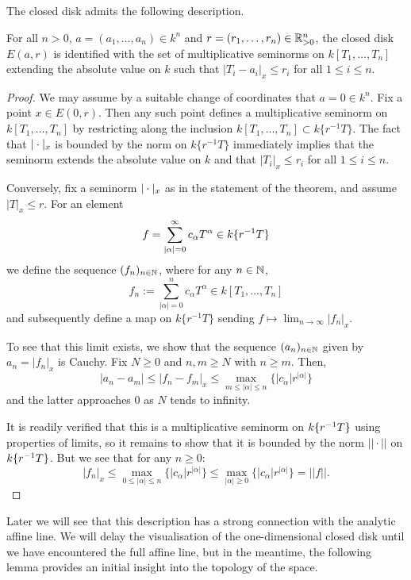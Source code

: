 The closed disk admits the following description.

\begin{prop}\label{prop:diskmaxpoint}\parencite[\S 1.4.4]{berk1}
    For all $n > 0$, $ {a} = (a_1, \dots, a_n) \in k^n$ and ${ {r} = (r_1, \dots, r_n) \in \mathbb{R}_{> 0}^n}$, the closed disk $E( {a},  {r})$ is identified with the set of multiplicative seminorms on $k[T_1, \dots, T_n]$ extending the absolute value on $k$ such that $|T_i - a_i|_x \leq r_i$ for all $1 \leq i \leq n$.
\end{prop}
\begin{proof}
    We may assume by a suitable change of coordinates that $ {a} =  {0} \in k^n$.
    Fix a point $x \in E(0, r)$. Then any such point defines a multiplicative seminorm on $k[T_1, \dots, T_n]$ by 
    restricting along the inclusion $k[T_1, \dots, T_n] \subset k\{r^{-1}T\}$. 
    The fact that $|\cdot|_x$ is bounded by the norm on $k\{r^{-1}T\}$ immediately implies that the seminorm extends the absolute value on $k$ and that $|T_i|_x \leq r_i$ for all $1 \leq i \leq n$.
    
    Conversely, fix a seminorm $|\cdot|_x$ as in the statement of the theorem, and assume $|T|_x \leq r$. For an element
    \[
        f = \sum\limits_{|\alpha| = 0}^{\infty} c_\alpha T^\alpha \in k\{r^{-1}T\}
    \]
    we define the sequence $(f_n)_{n \in \mathbb{N}}$, where for any $n \in \mathbb{N}$,
    \[
        f_n := \sum\limits_{|\alpha| = 0}^{n} c_{\alpha} T^{\alpha} \in k[T_1, \dots, T_n]
    \]
    and subsequently define a map on $k\{r^{-1}T\}$ sending $f \mapsto \lim_{n \to \infty} |f_n|_x$.
    
    To see that this limit exists, we show that the sequence $(a_n)_{n \in \mathbb{N}}$ given by $a_n = |f_n|_x$ is Cauchy. Fix $N \geq 0$ and $n, m \geq N$ with $n \geq m$. Then, 
    \[|a_n - a_m| \leq |f_n - f_m|_x \leq \max_{m \leq |\alpha| \leq n} \{ |c_{\alpha}| r^{|\alpha|} \}\]
    and the latter approaches $0$ as $N$ tends to infinity.
    
    It is readily verified that this is a multiplicative seminorm on $k\{r^{-1}T\}$ using properties of limits, so it remains to show that it is bounded by the norm $||\cdot||$ on $k\{r^{-1}T\}$.
    But we see that for any $n \geq 0$: \[|f_n|_x \leq \max_{0 \leq |\alpha| \leq n} \{ |c_{\alpha}| r^{|\alpha|}\} \leq \max_{|\alpha| \geq 0} \{ |c_\alpha| r^{|\alpha|}\} = ||f||.\]
\end{proof}

Later we will see that this description has a strong connection with the analytic affine line. We will delay the visualisation of the one-dimensional closed disk until we have encountered the full affine line, but in the meantime, the following lemma provides an initial insight into the topology of the space.

